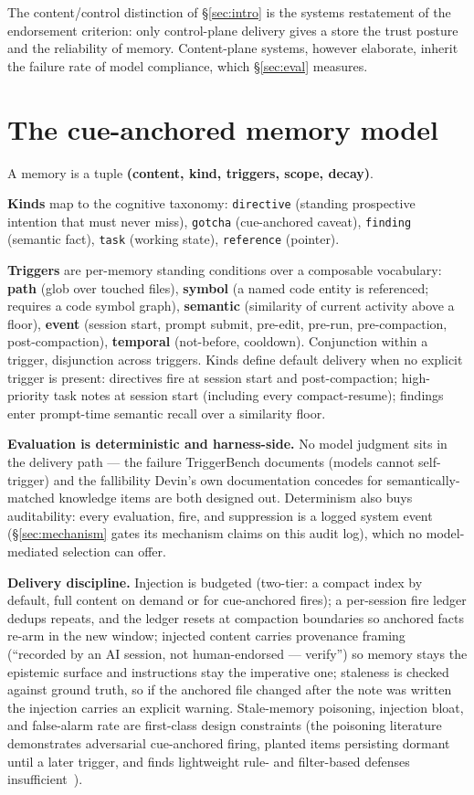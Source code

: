 \documentclass[11pt]{article}
\begin{document}
The content/control distinction of \S\ref{sec:intro} is the systems restatement of the
endorsement criterion: only control-plane delivery gives a store the
trust posture and the reliability of memory. Content-plane systems,
however elaborate, inherit the failure rate of model compliance, which
\S\ref{sec:eval} measures.

\section{The cue-anchored memory model}
\label{sec:model}

A memory is a tuple \textbf{(content, kind, triggers, scope, decay)}.

\textbf{Kinds} map to the cognitive taxonomy: \texttt{directive} (standing
prospective intention that must never miss), \texttt{gotcha} (cue-anchored
caveat), \texttt{finding} (semantic fact), \texttt{task} (working state), \texttt{reference}
(pointer).

\textbf{Triggers} are per-memory standing conditions over a composable
vocabulary: \textbf{path} (glob over touched files), \textbf{symbol} (a named code
entity is referenced; requires a code symbol graph), \textbf{semantic}
(similarity of current activity above a floor), \textbf{event} (session
start, prompt submit, pre-edit, pre-run, pre-compaction,
post-compaction), \textbf{temporal} (not-before, cooldown). Conjunction
within a trigger, disjunction across triggers. Kinds define default
delivery when no explicit trigger is present: directives fire at session
start and post-compaction; high-priority task notes at session start
(including every compact-resume); findings enter prompt-time semantic
recall over a similarity floor.

\textbf{Evaluation is deterministic and harness-side.} No model judgment sits
in the delivery path --- the failure TriggerBench documents (models cannot
self-trigger) and the fallibility Devin's own documentation concedes for
semantically-matched knowledge items are both designed out. Determinism
also buys auditability: every evaluation, fire, and suppression is a
logged system event (\S\ref{sec:mechanism} gates its mechanism claims on this audit log),
which no model-mediated selection can offer.

\textbf{Delivery discipline.} Injection is budgeted (two-tier: a compact
index by default, full content on demand or for cue-anchored fires); a
per-session fire ledger dedups repeats, and the ledger resets at
compaction boundaries so anchored facts re-arm in the new window;
injected content carries provenance framing (``recorded by an AI session,
not human-endorsed --- verify'') so memory stays the epistemic surface and
instructions stay the imperative one; staleness is checked against
ground truth, so if the anchored file changed after the note was written
the injection carries an explicit warning. Stale-memory poisoning,
injection bloat, and false-alarm rate are first-class design constraints
(the poisoning literature demonstrates adversarial cue-anchored
firing, planted items persisting dormant until a later trigger, and
finds lightweight rule- and filter-based defenses insufficient~\cite{sleeper}).
\end{document}
